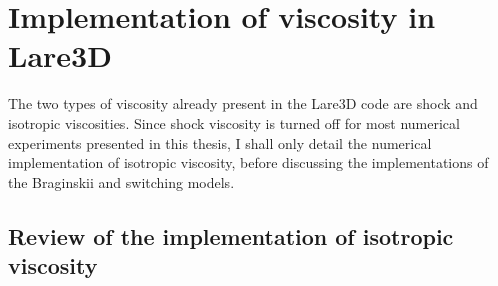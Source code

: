 
\section{Implementation of viscosity in Lare3D}

The two types of viscosity already present in the Lare3D code are shock and isotropic viscosities. Since shock viscosity is turned off for most numerical experiments presented in this thesis, I shall only detail the numerical implementation of isotropic viscosity, before discussing the implementations of the Braginskii and switching models.

\subsection{Review of the implementation of isotropic viscosity}

